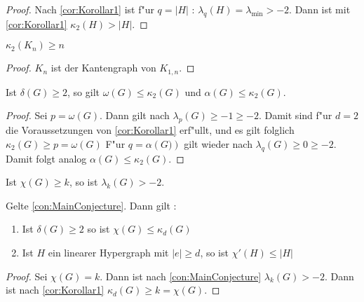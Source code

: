\begin{proof}
    
    Nach \ref{cor:Korollar1} ist f"ur $q=\left|H\right|$ : $\lambda_q(H)=\lambda_{\text{min}}> -2$. Dann ist mit \ref{cor:Korollar1} $\kappa_{2}\left( H \right) > \left| H\right|$.
\end{proof}

\begin{corollary}[Klotz]
    $\kappa_{2}\left( K_n \right) \geq n$
\end{corollary}

\begin{proof}
    $K_n$ ist der Kantengraph von $K_{1,n}$.
\end{proof}
\begin{corollary}
    Ist $\delta\left( G \right) \geq 2$, so gilt $\omega\left( G \right)\leq \kappa_{2}\left( G \right)$ und $\alpha\left( G \right)\leq \kappa_{2}\left( G \right)$.
\end{corollary}

\begin{proof}
    Sei $p = \omega(G)$. Dann gilt nach $\lambda_{p}\left( G \right)\geq -1\geq -2$. Damit sind f"ur $d=2$ die Voraussetzungen von \ref{cor:Korollar1} erf"ullt, und es gilt folglich $\kappa_{2}\left( G \right)\geq p = \omega\left( G \right)$ 
    F"ur $q=\alpha\left( G) \right)$ gilt wieder nach $\lambda_{q}\left( G \right)\geq 0 \geq -2$. Damit folgt analog $\alpha\left( G \right) \leq \kappa_{2}\left( G \right)$.
\end{proof}
\begin{conjecture}
    \label{con:MainConjecture}
    Ist $\chi\left( G \right) \geq k$, so ist $\lambda_k\left( G \right) > -2$.
\end{conjecture}

\begin{theorem}
    \label{thm:MainTheorem}
    Gelte \ref{con:MainConjecture}. Dann gilt :
    \begin{enumerate}[label=(\roman*)]
        \item Ist $\delta\left( G \right) \geq 2$ so ist $\chi\left( G \right)\leq \kappa_{d}\left( G \right)$
        \item  Ist $H$ ein linearer Hypergraph mit $\left|e\right| \geq d$, so ist $\chi'\left( H \right)\leq \left|H\right| $
    \end{enumerate}
\end{theorem}

\begin{proof}
    Sei $\chi(G) = k$. Dann ist nach \ref{con:MainConjecture} $\lambda_{k}\left( G \right) > -2$. Dann ist nach \ref{cor:Korollar1} $\kappa_{d}\left( G \right) \geq k = \chi\left( G \right)$.
\end{proof}
